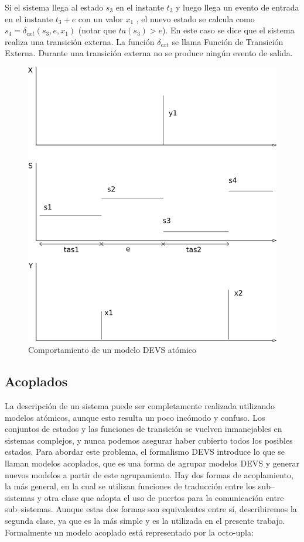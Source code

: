 \documentclass[a4paper,	11pt]{report}
\begin{document}
Si el sistema llega al estado $s_3$ en el instante $t_3$ y luego llega un evento de entrada en el instante $t_3 + e$ con un valor $x_1$ , el nuevo estado se calcula como $s_4 = \delta_{ext} (s_3 , e, x_1 )$ (notar que $ta(s_3 ) > e$). En este caso se dice que el sistema realiza una transición externa. La función $\delta_{ext}$ se llama Función de Transición Externa. Durante una transición externa no se produce ningún evento de salida.
\begin{figure}[!htbp]
  \includegraphics[scale=0.5]{devs-atomic}
  \caption{Comportamiento de un modelo DEVS atómico}
   \label{fig:fig2-5}
\end{figure}

\subsection{Acoplados}
La descripción de un sistema puede ser completamente realizada utilizando modelos atómicos, aunque esto resulta un poco incómodo y confuso. Los conjuntos de estados y las funciones de transición se vuelven inmanejables en sistemas complejos, y nunca podemos asegurar haber cubierto todos los posibles estados.
Para abordar este problema, el formalismo DEVS introduce lo que se llaman modelos acoplados, que es una forma de agrupar modelos DEVS y generar nuevos modelos a partir de este agrupamiento.
Hay dos formas de acoplamiento, la más general, en la cual se utilizan funciones de traducción entre los sub–sistemas y otra clase que adopta el uso de puertos para la comunicación entre sub–sistemas. Aunque estas dos formas son equivalentes entre sí, describiremos la segunda clase, ya que es la más simple y es la utilizada en el presente trabajo.
Formalmente un modelo acoplado está representado por la octo-upla:
\end{document}
